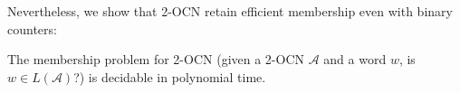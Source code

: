 \documentclass[USenglish]{lipics-v2021}
\newcommand{\shtodo}[1]{\todo[color=cyan!25,size=\small]{SH: #1}}
\newcommand{\tup}[1]{\langle #1 \rangle}
\newcommand{\initstate}{q_{\mathrm{init}}}
\newcommand{\accstate}{q_{\mathrm{acc}}}
\newcommand{\cA}{\mathcal{A}}
\begin{document}
Nevertheless, we show that 2-OCN retain efficient membership even with binary
counters:
\begin{theorem}
	\label{thm:membership_PTIME}
	The membership problem for 2-OCN (given a 2-OCN $\cA$ and a word $w$, is $w\in
	L(\cA)$?) is decidable in polynomial time.
\end{theorem}
	
	
\end{document}
